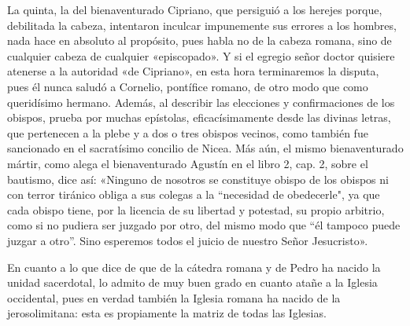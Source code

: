 La quinta, la del bienaventurado Cipriano, que persiguió a los herejes porque, debilitada la cabeza, intentaron inculcar impunemente sus errores a los hombres, nada hace en absoluto al propósito, pues habla no de la cabeza romana, sino de cualquier cabeza de cualquier «episcopado». Y si el egregio señor doctor quisiere atenerse a la autoridad «de Cipriano», en esta hora terminaremos la disputa, pues él nunca saludó a Cornelio, pontífice romano, de otro modo que como queridísimo hermano. Además, al describir las elecciones y confirmaciones de los obispos, prueba por muchas epístolas, eficacísimamente desde las divinas letras, que pertenecen a la plebe y a dos o tres obispos vecinos, como también fue sancionado en el sacratísimo concilio de Nicea. Más aún, el mismo bienaventurado mártir, como alega el bienaventurado Agustín en el libro 2, cap. 2, sobre el bautismo, dice así: «Ninguno de nosotros se constituye obispo de los obispos ni con terror tiránico obliga a sus colegas a la “necesidad de obedecerle", ya que cada obispo tiene, por la licencia de su libertad y potestad, su propio arbitrio, como si no pudiera ser juzgado por otro, del mismo modo que “él tampoco puede juzgar a otro”. Sino esperemos todos el juicio de nuestro Señor Jesucristo».

En cuanto a lo que dice de que de la cátedra romana y de Pedro ha nacido la unidad sacerdotal, lo admito de muy buen grado en cuanto atañe a la Iglesia occidental, pues en verdad también la Iglesia romana ha nacido de la jerosolimitana: esta es propiamente la matriz de todas las Iglesias.

